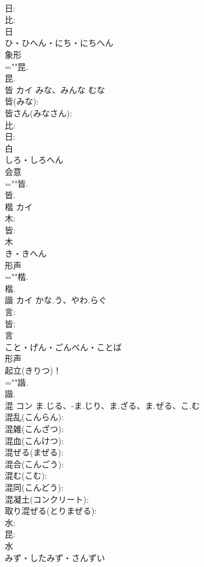 \documentclass[8pt]{extreport}
\begin{document}
\begin{CJK}{UTF8}{min}
\\	日: 
\\	比: 
\\	日	
\\	ひ・ひへん・にち・にちへん	
\\	象形 
\\	=""昆.
\\	昆.
\\	皆	カイ	みな、みんな	むな	
\\	皆(みな): 
\\	皆さん(みなさん): 
\\	比: 
\\	日: 
\\	白	
\\	しろ・しろへん	
\\	会意 
\\	=""皆.
\\	皆.
\\	楷	カイ			
\\	木: 
\\	皆: 
\\	木	
\\	き・きへん	
\\	形声 
\\	=""楷.
\\	楷.
\\	諧	カイ	かな.う、やわ.らぐ		
\\	言: 
\\	皆: 
\\	言	
\\	こと・げん・ごんべん・ことば	
\\	形声 
\\	起立(きりつ)！ 
\\	=""諧.
\\	諧.
\\	混	コン	ま.じる、-ま.じり、ま.ざる、ま.ぜる、こ.む		
\\	混乱(こんらん): 
\\	混雑(こんざつ): 
\\	混血(こんけつ): 
\\	混ぜる(まぜる): 
\\	混合(こんごう): 
\\	混む(こむ): 
\\	混同(こんどう): 
\\	混凝土(コンクリート): 
\\	取り混ぜる(とりまぜる): 
\\	水: 
\\	昆: 
\\	水	
\\	みず・したみず・さんずい	

\end{CJK}
\end{document}

